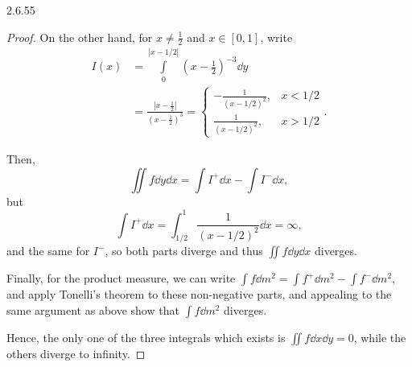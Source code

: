 \documentclass[11pt]{article}
\begin{document}
\begin{problem}{2.6.55}
\begin{enumerate}[label=\alph*.]
\begin{proof}
          On the other hand, for \( x \neq \frac{1}{2} \) and \( x \in [0,1] \), write
          \begin{equation}
          \label{eq:14}
          \begin{aligned}
            I(x) &= \int\limits_0^{|x-1/2|}(x- \frac{1}{2})^{-3} \dd{y} \\
            &= \frac{|x- \frac{1}{2}|}{(x - \frac{1}{2})^3} = \begin{cases}
              - \frac{1}{(x - 1/2)^2}, & x < 1/2 \\
              \frac{1}{(x-1/2)^2}, & x > 1/2
            \end{cases}.
          \end{aligned}
        \end{equation}

        Then,
        \begin{equation}
        \label{eq:15}
        \iint f \dd{y} \dd{x} = \int I^+ \dd{x} - \int I^- \dd{x},
      \end{equation}
      but
      \begin{equation}
      \label{eq:16}
      \int I^+ \dd{x} = \int_{1/2}^1 \frac{1}{(x-1/2)^2} \dd{x} = \infty,
    \end{equation}
    and the same for \( I^- \), so both parts diverge and thus \( \iint f \dd{y}\dd{x} \) diverges.

    Finally, for the product measure, we can write \( \int f \dd{m^2} = \int f^+ \dd{m^2} - \int f^- \dd{m^2}\), and apply Tonelli's theorem to these non-negative parts, and appealing to the same argument as above show that \( \int f \dd{m^2} \) diverges.

    Hence, the only one of the three integrals which exists is \( \iint f \dd{x}\dd{y} = 0\), while the others diverge to infinity.
          \end{proof}
  \end{enumerate}
\end{problem}
\end{document}
